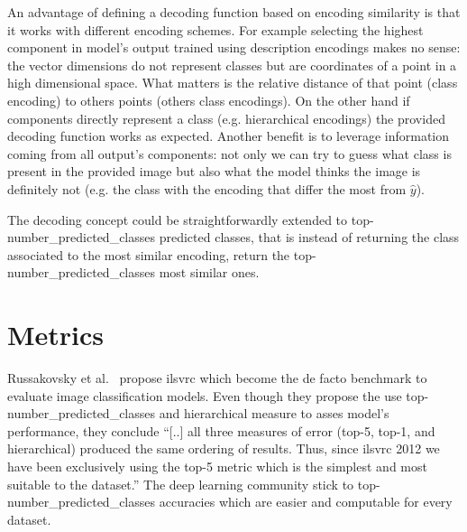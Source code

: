 An advantage of defining a decoding function based on encoding similarity is that it works with different encoding schemes. For example selecting the highest component in model's output trained using description encodings makes no sense: the vector dimensions do not represent classes but are coordinates of a point in a high dimensional space. What matters is the relative distance of that point (class encoding) to others points (others class encodings).
On the other hand if components directly represent a class (e.g. hierarchical encodings) the provided decoding function works as expected.
Another benefit is to leverage information coming from all output's components: not only we can try to guess what class is present in the provided image but also what the model thinks the image is definitely not (e.g. the class with the encoding that differ the most from $\hat{y}$).\medskip

The decoding concept could be straightforwardly extended to top-\gls{number_predicted_classes} predicted classes, that is instead of returning the class associated to the most similar encoding, return the top-\gls{number_predicted_classes} most similar ones.



\section{Metrics}
\label{sec:metrics}
Russakovsky et al.~\cite{ImagenetLargeRussak2014} propose \acrfull{ilsvrc} which become the de facto benchmark to evaluate image classification models.
Even though they propose the use top-\gls{number_predicted_classes} and hierarchical measure to asses model's performance, they conclude ``[..] all three measures of error (top-5, top-1, and hierarchical) produced the same ordering of results. Thus, since \acrshort{ilsvrc} 2012 we have been exclusively using the top-5 metric which is the simplest and most suitable to the dataset.''
The deep learning community stick to top-\gls{number_predicted_classes} accuracies which are easier and computable for every dataset.


